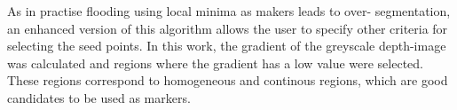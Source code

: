 
As in practise flooding using local minima as makers leads to over- segmentation, an enhanced version of this algorithm allows the user to specify other criteria for selecting the seed points. In this work, the gradient of the greyscale depth-image was calculated and regions where the gradient has a low value were selected. These regions correspond to homogeneous and continous regions, which are good candidates to be used as markers.